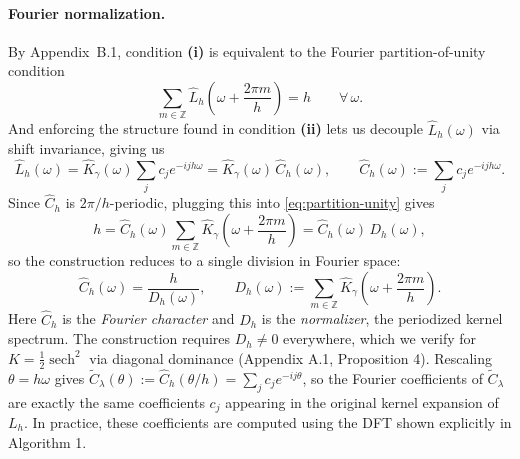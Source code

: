 \documentclass{article}
\begin{document}
\paragraph{Fourier normalization.}
By Appendix~B.1, condition \textbf{(i)} is equivalent to the Fourier partition-of-unity condition
\begin{equation}
\sum_{m \in \mathbb{Z}} \widehat{L}_h\!\left(\omega + \frac{2\pi m}{h}\right) = h
\qquad \forall\, \omega.
\label{eq:partition-unity}
\end{equation}
And enforcing the structure found in condition \textbf{(ii)} lets us decouple $\widehat{L}_h(\omega)$ via shift invariance, giving us
\[
\widehat{L}_h(\omega)
=
\widehat{K}_\gamma(\omega)\sum_j c_j e^{-ijh\omega}
=
\widehat{K}_\gamma(\omega)\,\widehat{C}_h(\omega),
\qquad
\widehat{C}_h(\omega) := \sum_j c_j e^{-ijh\omega}.
\]
Since \(\widehat{C}_h\) is \(2\pi/h\)-periodic, plugging this into \eqref{eq:partition-unity} gives
\[
h
=
\widehat{C}_h(\omega)\sum_{m \in \mathbb{Z}} \widehat{K}_\gamma\!\left(\omega + \frac{2\pi m}{h}\right)
=
\widehat{C}_h(\omega)\,D_h(\omega),
\]
so the construction reduces to a single division in Fourier space:
\begin{equation}
\widehat{C}_h(\omega) = \frac{h}{D_h(\omega)},
\qquad
D_h(\omega) := \sum_{m \in \mathbb{Z}} \widehat{K}_\gamma\!\left(\omega + \frac{2\pi m}{h}\right).
\label{eq:fourier-character}
\end{equation}
Here \(\widehat{C}_h\) is the \emph{Fourier character} and \(D_h\) is the \emph{normalizer}, the periodized kernel spectrum. The construction requires \(D_h \neq 0\) everywhere, which we verify for \(K = \tfrac{1}{2}\operatorname{sech}^2\) via diagonal dominance (Appendix A.1, Proposition 4). Rescaling \(\theta = h\omega\) gives \(\widetilde{C}_\lambda(\theta) := \widehat{C}_h(\theta/h) = \sum_j c_j e^{-ij\theta}\), so the Fourier coefficients of \(\widetilde{C}_\lambda\) are exactly the same coefficients \(c_j\) appearing in the original kernel expansion of \(L_h\). In practice, these coefficients are computed using the DFT shown explicitly in Algorithm 1.
\end{document}
